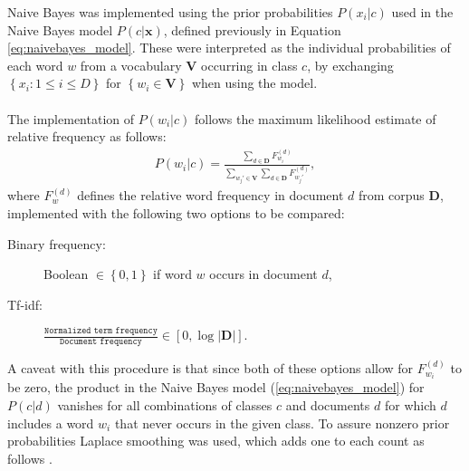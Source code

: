 
Naive Bayes was implemented using the prior probabilities $P(x_i\vert c)$ used in the Naive Bayes model $P(c\vert\mathbf{x})$, defined previously in Equation \ref{eq:naivebayes_model}. These were interpreted as the individual probabilities of each word $w$ from a vocabulary $\mathbf{V}$ occurring in class $c$, by exchanging $\left\{x_i : 1 \le i \le D\right\}$ for $\left\{w_i \in \mathbf{V}\right\}$ when using the model.
\\\\
The implementation of $P(w_i\vert c)$ follows the maximum likelihood estimate of relative frequency as follows:
\begin{align}
P(w_i\vert c) =
\frac
	{
		\sum_{d \in \mathbf{D}} F_{w_i}^{(d)}
	}
	{
		\sum_{w_j' \in \mathbf{V}} \sum_{d \in \mathbf{D}}  F_{w_j'}^{(d)}
	},
\end{align}
where $F_w^{(d)}$ defines the relative word frequency in document $d$ from corpus $\mathbf{D}$, implemented with the following two options to be compared:
\begin{description}
  \item[Binary frequency:] Boolean $\in \left\{0,1\right\}$ if word $w$ occurs in document $d$,
  \item[Tf-idf:] $\frac{\texttt{Normalized term frequency}}{\texttt{Document frequency}} \in \left[0, \log \left\vert \mathbf{D}\right\vert\right]$.
\end{description}
A caveat with this procedure is that since both of these options allow for $F_{w_i}^{(d)}$ to be zero, the product in the Naive Bayes model (\ref{eq:naivebayes_model}) for $P(c\vert d)$ vanishes for all combinations of classes $c$ and documents $d$ for which $d$ includes a word $w_i$ that never occurs in the given class. To assure nonzero prior probabilities Laplace smoothing was used, which adds one to each count as follows \citep{nb_ref}. 

